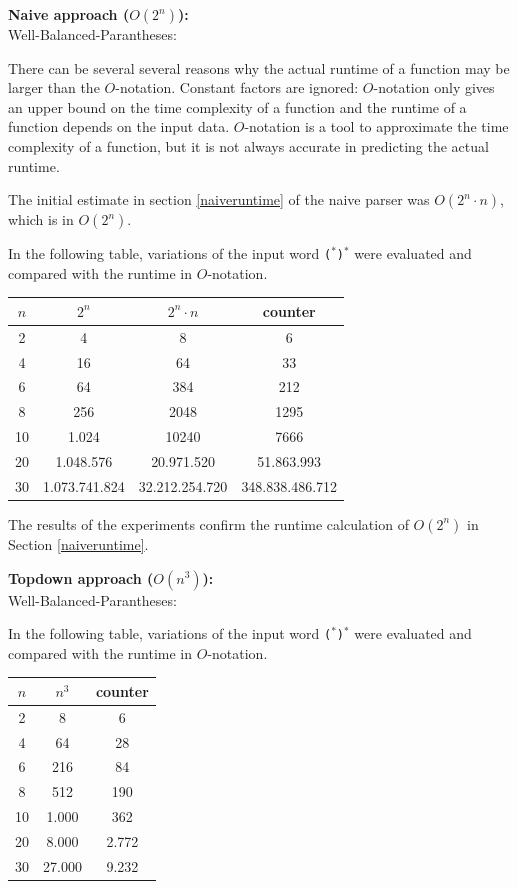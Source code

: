 \documentclass[a4paper, 11pt]{article}
\begin{document}
\textbf{Naive approach ($O(2^n)$):} \\
Well-Balanced-Parantheses: 

There can be several several reasons why the actual runtime of a function may be larger than the $O$-notation.
Constant factors are ignored: $O$-notation only gives an upper bound on the time complexity of a function and the runtime of a function depends on the input data. 
$O$-notation is a tool to approximate the time complexity of a function, but it is not always accurate in predicting the actual runtime.

The initial estimate in section \ref{naiveruntime} of the naive parser was $O(2^n \cdot n)$, which is in $O(2^n)$. 

In the following table, variations of the input word \texttt{($^*$)$^*$} were evaluated and compared with the runtime in $O$-notation.

\begin{center}
\begin{tabular}{|c|c|c|c|}
\hline
$n$ & $2^n$ & $2^n \cdot n$ & counter \\
\hline
2& 4 & 8 & 6\\
4& 16 & 64 & 33\\
6& 64 & 384 & 212\\
8& 256 & 2048 & 1295\\
10& 1.024 & 10240 & 7666 \\
20& 1.048.576 & 20.971.520 & 51.863.993\\
30& 1.073.741.824 & 32.212.254.720 & 348.838.486.712\\
\hline
\end{tabular}
\end{center}


The results of the experiments confirm the runtime calculation of $O(2^n)$ in Section \ref{naiveruntime}. 







\textbf{Topdown approach ($O(n^3)$):} \\
Well-Balanced-Parantheses: 

In the following table, variations of the input word \texttt{($^*$)$^*$} were evaluated and compared with the runtime in $O$-notation.

\begin{center}
\begin{tabular}{|c|c|c|}
\hline
$n$ & $n^3$ & counter \\
\hline
2& 8 & 6\\
4& 64 & 28\\
6& 216 & 84\\
8& 512 & 190\\
10& 1.000 & 362 \\
20& 8.000 & 2.772\\
30& 27.000 & 9.232\\
\hline
\end{tabular}
\end{center}
\end{document}
